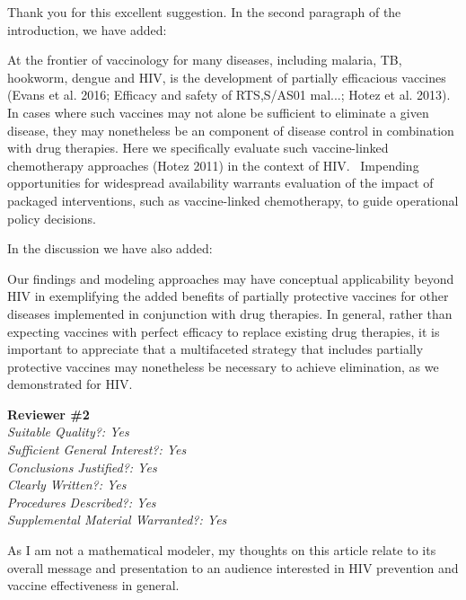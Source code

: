 \documentclass[12pt]{jpmletter}
\newcommand{\section}[1]{\textbf{#1}\\}
\newenvironment{original}{\it}{}
\begin{document}
\begin{letter}{}
    Thank you for this excellent suggestion. In the second paragraph
    of the introduction, we have added:
    \begin{quoting}
      At the frontier of vaccinology for many diseases, including
      malaria, TB, hookworm, dengue and HIV, is the development of
      partially efficacious vaccines (Evans et al. 2016; Efficacy and
      safety of RTS,S/AS01 mal...; Hotez et al. 2013). In cases where
      such vaccines may not alone be sufficient to eliminate a given
      disease, they may nonetheless be an component of disease control
      in combination with drug therapies. Here we specifically
      evaluate such vaccine-linked chemotherapy approaches (Hotez
      2011) in the context of HIV.  Impending opportunities for
      widespread availability warrants evaluation of the impact of
      packaged interventions, such as vaccine-linked chemotherapy, to
      guide operational policy decisions.
    \end{quoting}
    
    In the discussion we have also added:
    \begin{quoting}
      Our findings and modeling approaches may have conceptual
      applicability beyond HIV in exemplifying the added benefits of
      partially protective vaccines for other diseases implemented in
      conjunction with drug therapies. In general, rather than
      expecting vaccines with perfect efficacy to replace existing
      drug therapies, it is important to appreciate that a
      multifaceted strategy that includes partially protective
      vaccines may nonetheless be necessary to achieve elimination, as
      we demonstrated for HIV.
    \end{quoting}
    
    \section{Reviewer \#2}
    \begin{original}
      Suitable Quality?: Yes \\
      Sufficient General Interest?: Yes \\
      Conclusions Justified?: Yes \\
      Clearly Written?: Yes \\
      Procedures Described?: Yes \\
      Supplemental Material Warranted?: Yes
 
      As I am not a mathematical modeler, my thoughts on this article
      relate to its overall message and presentation to an audience
      interested in HIV prevention and vaccine effectiveness in
      general.


\end{original}
\end{letter}
\end{document}
